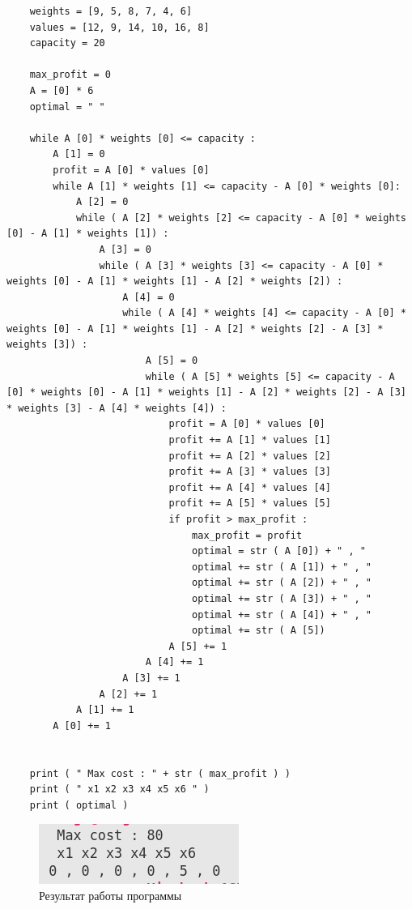 \begin{lstlisting}
    weights = [9, 5, 8, 7, 4, 6]
    values = [12, 9, 14, 10, 16, 8]
    capacity = 20
    
    max_profit = 0
    A = [0] * 6
    optimal = " "
    
    while A [0] * weights [0] <= capacity :
        A [1] = 0
        profit = A [0] * values [0]
        while A [1] * weights [1] <= capacity - A [0] * weights [0]:
            A [2] = 0
            while ( A [2] * weights [2] <= capacity - A [0] * weights [0] - A [1] * weights [1]) :
                A [3] = 0
                while ( A [3] * weights [3] <= capacity - A [0] * weights [0] - A [1] * weights [1] - A [2] * weights [2]) :
                    A [4] = 0
                    while ( A [4] * weights [4] <= capacity - A [0] * weights [0] - A [1] * weights [1] - A [2] * weights [2] - A [3] * weights [3]) :
                        A [5] = 0
                        while ( A [5] * weights [5] <= capacity - A [0] * weights [0] - A [1] * weights [1] - A [2] * weights [2] - A [3] * weights [3] - A [4] * weights [4]) :
                            profit = A [0] * values [0]
                            profit += A [1] * values [1]
                            profit += A [2] * values [2]
                            profit += A [3] * values [3]
                            profit += A [4] * values [4]
                            profit += A [5] * values [5]
                            if profit > max_profit :
                                max_profit = profit
                                optimal = str ( A [0]) + " , "
                                optimal += str ( A [1]) + " , "
                                optimal += str ( A [2]) + " , "
                                optimal += str ( A [3]) + " , "
                                optimal += str ( A [4]) + " , "
                                optimal += str ( A [5])
                            A [5] += 1
                        A [4] += 1
                    A [3] += 1
                A [2] += 1
            A [1] += 1
        A [0] += 1
    
    
    print ( " Max cost : " + str ( max_profit ) )
    print ( " x1 x2 x3 x4 x5 x6 " )
    print ( optimal )

\end{lstlisting}

\begin{figure}[h]
    \centering
    \includegraphics[]{10.png}
    \centering
    \caption{Результат работы программы}
\end{figure}
